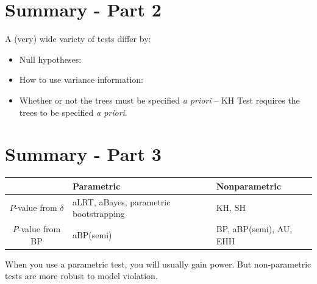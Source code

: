 \documentclass[landscape]{foils}
\begin{document}
\section*{Summary - Part 2}
\normalsize
A (very) wide variety of tests differ by:
\begin{itemize}
	\item Null hypotheses:
	\item How to use variance information:
	\item Whether or not the trees must be specified {\em a priori} -- KH Test requires the trees to be specified {\em a priori}.
\end{itemize}

\myNewSlide
\section*{Summary - Part 3}
\large
\begin{table}[htdp]
\begin{center}
\begin{tabular}{|c|p{7cm}|p{6cm}|}
\hline
& Parametric & Nonparametric \\
\hline
$P$-value from $\delta$  & aLRT, aBayes, parametric bootstrapping & KH, SH \\
\hline
$P$-value from BP  &aBP(semi)  & BP, aBP(semi), AU, EHH\\
\hline
\end{tabular}
\end{center}
\label{default}
\end{table}%

When you use a parametric test, you will usually gain power. But non-parametric tests are more robust to model violation.
\end{document}
